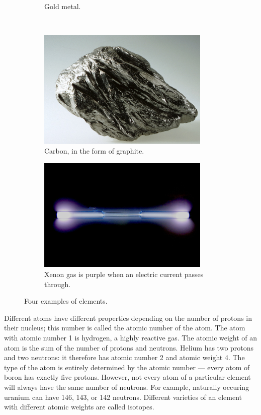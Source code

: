 \documentclass[a4paper]{memoir}
\begin{document}
\begin{figure}
\begin{subfigure}[t]{0.45\textwidth}
    \caption{Gold metal.}
  \end{subfigure}\\
  \begin{subfigure}[t]{0.45\textwidth}
    \centering
    \includegraphics[width=0.9\textwidth]{graphite}
    \caption{Carbon, in the form of graphite.}
  \end{subfigure}%
  \begin{subfigure}[t]{0.45\textwidth}
    \centering
    \includegraphics[width=0.9\textwidth]{xenon}
    \caption{Xenon gas is purple when an electric current passes through.}
  \end{subfigure}
  \caption{Four examples of elements.\label{fig:elements}}
\end{figure}

Different atoms have different properties depending on the number of protons in their nucleus; this number is called the atomic number of
the atom. The atom with atomic number 1 is hydrogen, a highly reactive gas. The atomic weight of an atom is the sum of the number of protons
and neutrons. Helium has two protons and two neutrons: it therefore has atomic number 2 and atomic weight 4. The type of the atom is entirely
determined by the atomic number --- every atom of boron has exactly five protons. However, not every atom of a particular element will always
have the same number of neutrons. For example, naturally occuring uranium can have 146, 143, or 142 neutrons. Different varieties of an element
with different atomic weights are called isotopes.
\end{document}
